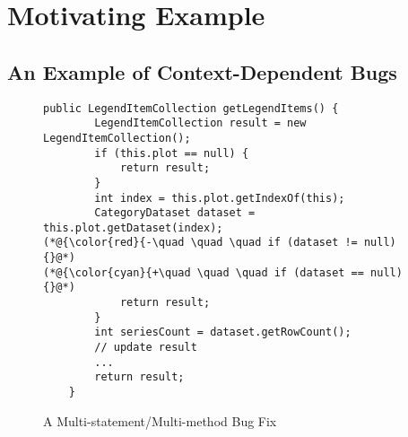\section{Motivating Example}
\label{motiv:sec}

\subsection{An Example of Context-Dependent Bugs}

\begin{figure}[t]
	\centering
	\begin{lstlisting}[]
    public LegendItemCollection getLegendItems() {
        LegendItemCollection result = new LegendItemCollection();
        if (this.plot == null) {
            return result;
        }
        int index = this.plot.getIndexOf(this);
        CategoryDataset dataset = this.plot.getDataset(index);
(*@{\color{red}{-\quad \quad \quad if (dataset != null) {}@*)
(*@{\color{cyan}{+\quad \quad \quad if (dataset == null) {}@*)
            return result;
        }
        int seriesCount = dataset.getRowCount();
        // update result
        ...
        return result;
    }
	\end{lstlisting}
        \vspace{-15pt}
        \caption{A Multi-statement/Multi-method Bug Fix}
        \vspace{-8pt}
        \label{fig:motiv}
\end{figure}


